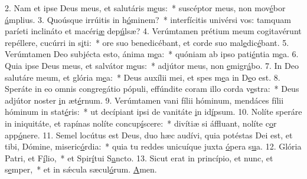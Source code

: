 2. Nam et ipse Deus meus, et salutáris m\uline{e}us:~* suscéptor meus, non mov\uline{é}bor \uline{á}mplius.
3. Quoúsque irrúitis in h\uline{ó}minem?~* interfícitis univérsi vos: tamquam paríeti inclináto et macéri\uline{æ} dep\uline{ú}lsæ?
4. Verúmtamen prétium meum cogitavérunt repéllere, cucúrri in s\uline{i}ti:~* ore suo benedicébant, et corde suo mal\uline{e}dic\uline{é}bant.
5. Verúmtamen Deo subjécta esto, ánima m\uline{e}a:~* quóniam ab ipso pati\uline{é}ntia m\uline{e}a.
6. Quia ipse Deus meus, et salvátor m\uline{e}us:~* adjútor meus, non \uline{e}migr\uline{á}bo.
7. In Deo salutáre meum, et glória m\uline{e}a:~* Deus auxílii mei, et spes m\uline{e}a in D\uline{e}o est.
8. Speráte in eo omnis congregátio pópuli, effúndite coram illo corda v\uline{e}stra:~* Deus adjútor noster \uline{i}n æt\uline{é}rnum.
9. Verúmtamen vani fílii hóminum, mendáces fílii hóminum in stat\uline{é}ris:~* ut decípiant ipsi de vanitáte \uline{i}n id\uline{í}psum.
10. Nolíte speráre in iniquitáte, et rapínas nolíte concup\uline{í}scere:~* divítiæ si áffluant, nolíte c\uline{o}r app\uline{ó}nere.
11. Semel locútus est Deus, duo hæc audívi, quia potéstas Dei est, et tibi, Dómine, miseric\uline{ó}rdia:~* quia tu reddes unicuíque juxta \uline{ó}pera s\uline{u}a.
12. Glória Patri, et F\uline{í}lio,~* et Spir\uline{í}tui S\uline{a}ncto.
13. Sicut erat in princípio, et nunc, et s\uline{e}mper,~* et in sǽcula sæcul\uline{ó}rum. \uline{A}men.

